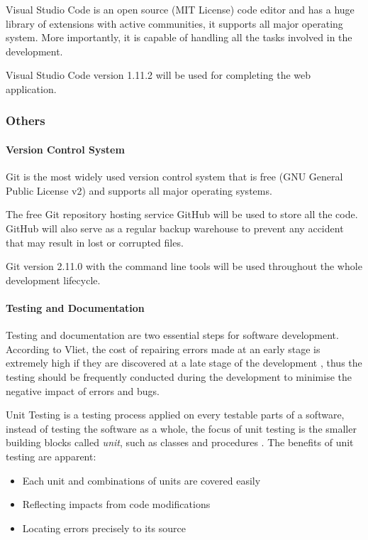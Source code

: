 \documentclass[11pt,a4paper]{article}
\begin{document}
Visual Studio Code is an open source (MIT License) code editor and has a huge library of extensions with active communities, it supports all major operating system. More importantly, it is capable of handling all the tasks involved in the development.

Visual Studio Code version 1.11.2 will be used for completing the web application.

\subsubsection{Others}
\paragraph{Version Control System}\hfil\newline
Git is the most widely used version control system that is free (GNU General Public License v2) and supports all major operating systems. 

The free Git repository hosting service GitHub will be used to store all the code. GitHub will also serve as a regular backup warehouse to prevent any accident that may result in lost or corrupted files.

Git version 2.11.0 with the command line tools will be used throughout the whole development lifecycle.

\paragraph{Testing and Documentation}\hfil\newline
Testing and documentation are two essential steps for software development. According to Vliet, the cost of repairing errors made at an early stage is extremely high if they are discovered at a late stage of the development \parencite[p. 386]{Vliet2007}, thus the testing should be frequently conducted during the development to minimise the negative impact of errors and bugs.

Unit Testing is a testing process applied on every testable parts of a software, instead of testing the software as a whole, the focus of unit testing is the smaller building blocks called \textit{unit}, such as classes and procedures \parencite[p. 85]{Myers2004a}. The benefits of unit testing are apparent:
\begin{itemize}
	\item Each unit and combinations of units are covered easily
	\item Reflecting impacts from code modifications
	\item Locating errors precisely to its source
\end{itemize}
\end{document}

